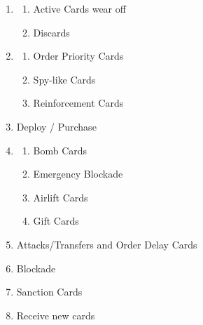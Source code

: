 \begin{enumerate}
    \item 
    \begin{enumerate}
        \item Active Cards wear off
        \item Discards
    \end{enumerate}
    \item 
    \begin{enumerate}
        \item Order Priority Cards
        \item Spy-like Cards
        \item Reinforcement Cards
    \end{enumerate}
    \item Deploy / Purchase
    \item 
    \begin{enumerate}
        \item Bomb Cards
        \item Emergency Blockade
        \item Airlift Cards
        \item Gift Cards
    \end{enumerate}
    \item Attacks/Transfers and Order Delay Cards
    \item Blockade
    \item Sanction Cards
    \item Receive new cards
\end{enumerate}

